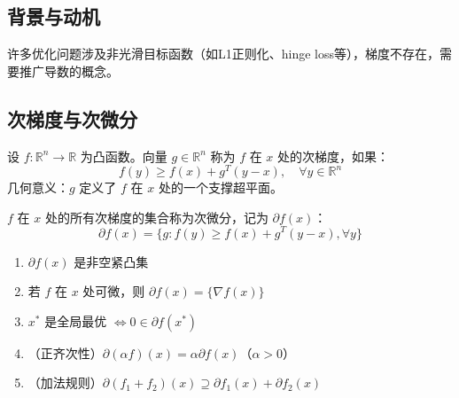 \subsection{背景与动机}

许多优化问题涉及非光滑目标函数（如L1正则化、hinge loss等），梯度不存在，需要推广导数的概念。

\subsection{次梯度与次微分}\label{sec:subgradient-def}

\begin{definition}[次梯度]
设 $f: \mathbb{R}^n \to \mathbb{R}$ 为凸函数。向量 $g \in \mathbb{R}^n$ 称为 $f$ 在 $x$ 处的次梯度，如果：
\[
f(y) \geq f(x) + g^T(y - x), \quad \forall y \in \mathbb{R}^n
\]
几何意义：$g$ 定义了 $f$ 在 $x$ 处的一个支撑超平面。
\end{definition}

\begin{definition}[次微分]
$f$ 在 $x$ 处的所有次梯度的集合称为次微分，记为 $\partial f(x)$：
\[
\partial f(x) = \{g : f(y) \geq f(x) + g^T(y - x), \forall y\}
\]
\end{definition}

\begin{theorem}[次微分的性质]
\begin{enumerate}
    \item $\partial f(x)$ 是非空紧凸集
    \item 若 $f$ 在 $x$ 处可微，则 $\partial f(x) = \{\nabla f(x)\}$
    \item $x^*$ 是全局最优 $\Leftrightarrow 0 \in \partial f(x^*)$
    \item（正齐次性）$\partial(\alpha f)(x) = \alpha \partial f(x)$（$\alpha > 0$）
    \item（加法规则）$\partial(f_1 + f_2)(x) \supseteq \partial f_1(x) + \partial f_2(x)$
\end{enumerate}
\end{theorem}

